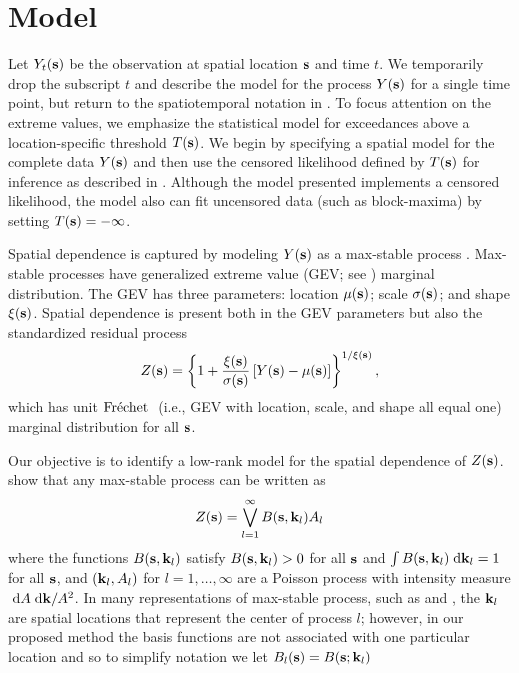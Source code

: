 \documentclass[aoas]{imsart}
\begin{document}
\section{Model}\label{ebs:model}

Let $Y_{t}(\mathbf{s})$ be the observation at spatial location $\mathbf{s}$ and time $t$.  We temporarily drop the subscript $t$ and describe the model for the process $Y(\mathbf{s})$ for a single time point, but return to the spatiotemporal notation in .
To focus attention on the extreme values, we emphasize the statistical model for exceedances above a location-specific threshold $T(\mathbf{s})$.
We begin by specifying a spatial model for the complete data $Y(\mathbf{s})$ and then use the censored likelihood defined by $T(\mathbf{s})$ for inference as described in .
Although the model presented implements a censored likelihood, the model also can fit uncensored data (such as block-maxima) by setting $T(\mathbf{s}) = -\infty$.

Spatial dependence is captured by modeling $Y(\mathbf{s})$ as a max-stable process \citep{deHaan2006}.
Max-stable processes have generalized extreme value (GEV; see ) marginal distribution.
The GEV has three parameters: location $\mu(\mathbf{s})$; scale $\sigma(\mathbf{s})$; and shape $\xi(\mathbf{s})$.
Spatial dependence is present both in the GEV parameters but also the standardized residual process
\begin{align} \label{ebeq:Y2Z}
 Z(\bs) = \left\{1+\frac{\xi(\bs)}{\sigma(\bs)}\left[Y(\bs) - \mu(\bs)\right]\right\}^{1/\xi(\bs)},
\end{align}
which has unit $\mbox{Fr$\acute{\mbox{e}}$chet }$ (i.e., GEV with location, scale, and shape all equal one) marginal distribution for all $\mathbf{s}$.

Our objective is to identify a low-rank model for the spatial dependence of $Z(\mathbf{s})$.
 show that any max-stable process can be written as
\begin{align} \label{ebeq:spectral}
  Z(\bs) = \bigvee_{l = 1}^{\infty} B(\bs, \bk_l)A_{l}
\end{align}
where the functions $B(\mathbf{s}, \mathbf{k}_l)$ satisfy $B(\mathbf{s}, \mathbf{k}_l) > 0$ for all $\mathbf{s}$ and $\int B(\mathbf{s}, \mathbf{k}_l) \; \text{d} \mathbf{k}_l = 1$ for all $\mathbf{s}$, and $(\mathbf{k}_l, A_l)$ for $l=1,\ldots,\infty$ are a Poisson process with intensity measure $\; \text{d} A \; \text{d} \mathbf{k}/A^2$.
In many representations of max-stable process, such as \citet{Smith1990} and \citet{Reich2012}, the $\mathbf{k}_l$ are spatial locations that represent the center of process $l$; however, in our proposed method the basis functions are not associated with one particular location and so to simplify notation we let $B_l(\mathbf{s}) = B(\mathbf{s}; \mathbf{k}_l)$
\end{document}
